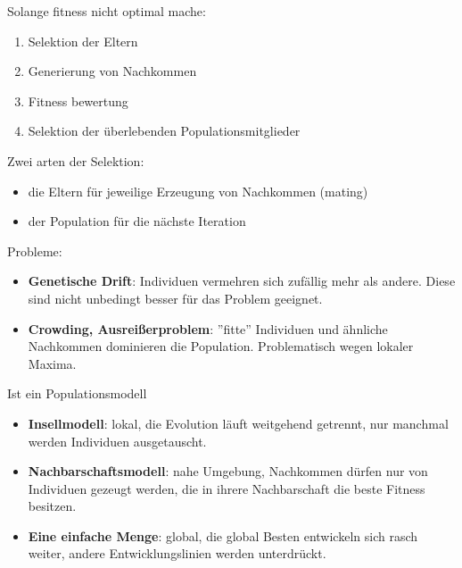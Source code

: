 Solange fitness nicht optimal mache:
\begin{enumerate}
    \item Selektion der Eltern
    \item Generierung von Nachkommen
    \item Fitness bewertung
    \item Selektion der überlebenden Populationsmitglieder
\end{enumerate}


Zwei arten der Selektion:
\begin{itemize}
    \item die Eltern für jeweilige Erzeugung von Nachkommen (mating)
    \item der Population für die nächste Iteration
\end{itemize}

Probleme:
\begin{itemize}
    \item \textbf{Genetische Drift}: Individuen vermehren sich zufällig mehr
    als andere. Diese sind nicht unbedingt besser für das Problem geeignet.
    \item \textbf{Crowding, Ausreißerproblem}: ''fitte'' Individuen und ähnliche
    Nachkommen dominieren die Population. Problematisch wegen lokaler Maxima.
\end{itemize}


Ist ein Populationsmodell
\begin{itemize}
    \item \textbf{Insellmodell}: lokal, die Evolution läuft weitgehend getrennt,
    nur manchmal werden Individuen ausgetauscht.
    \item \textbf{Nachbarschaftsmodell}: nahe Umgebung, Nachkommen dürfen nur von
    Individuen gezeugt werden, die in ihrere Nachbarschaft die beste Fitness
    besitzen.
    \item \textbf{Eine einfache Menge}: global, die global Besten entwickeln
    sich rasch weiter, andere Entwicklungslinien werden unterdrückt.
\end{itemize}


